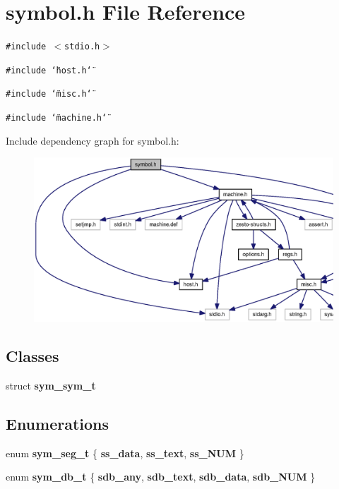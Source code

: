 \section{symbol.h File Reference}
\label{symbol_8h}
{\tt \#include $<$stdio.h$>$}\par
{\tt \#include \char`\"{}host.h\char`\"{}}\par
{\tt \#include \char`\"{}misc.h\char`\"{}}\par
{\tt \#include \char`\"{}machine.h\char`\"{}}\par


Include dependency graph for symbol.h:\nopagebreak
\begin{figure}[H]
\begin{center}
\leavevmode
\includegraphics[width=353pt]{symbol_8h__incl}
\end{center}
\end{figure}
\subsection*{Classes}
\begin{CompactItemize}
\item 
struct {\bf sym\_\-sym\_\-t}
\end{CompactItemize}
\subsection*{Enumerations}
\begin{CompactItemize}
\item 
enum {\bf sym\_\-seg\_\-t} \{ {\bf ss\_\-data}, 
{\bf ss\_\-text}, 
{\bf ss\_\-NUM}
 \}
\item 
enum {\bf sym\_\-db\_\-t} \{ {\bf sdb\_\-any}, 
{\bf sdb\_\-text}, 
{\bf sdb\_\-data}, 
{\bf sdb\_\-NUM}
 \}
\end{CompactItemize}
